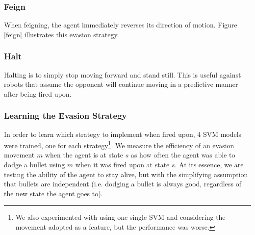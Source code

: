 \documentclass{article}
\theoremstyle{plain}
\theoremstyle{definition}
\theoremstyle{remark}
\begin{document}
\subsubsection*{Feign}
When feigning, the agent immediately reverses its direction of motion. Figure \ref{feign} illustrates this evasion strategy.

\subsubsection*{Halt}
Halting is to simply stop moving forward and stand still. This is useful against robots that assume the opponent will continue moving in a predictive manner after being fired upon.



\subsubsection*{Learning the Evasion Strategy}
In order to learn which strategy to implement when fired upon, 4 SVM models were trained, one for each strategy\footnote{We also experimented with using one single SVM and considering the movement adopted as a feature, but the performance was worse.}. We measure the efficiency of an evasion movement $m$ when the agent is at state $s$ as how often the agent was able to dodge a bullet using $m$ when it was fired upon at state $s$. At its essence, we are testing the ability of the agent to stay alive, but with the simplifying assumption that bullets are independent (i.e. dodging a bullet is always good, regardless of the new state the agent goes to).
\end{document}
